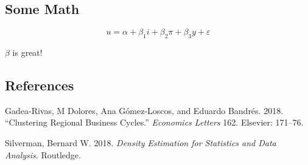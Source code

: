 \documentclass[]{article}
\begin{document}
\subsection{Some Math}\label{some-math}

\[
u = \alpha + \beta_1 i + \beta_2 \pi + \beta_3 y + \varepsilon
\]

\(\beta\) is great!

\subsection*{References}\label{references}

\hypertarget{refs}{}
\hypertarget{ref-gadea18}{}
Gadea-Rivas, M Dolores, Ana Gómez-Loscos, and Eduardo Bandrés. 2018.
``Clustering Regional Business Cycles.'' \emph{Economics Letters} 162.
Elsevier: 171--76.

\hypertarget{ref-silverman18}{}
Silverman, Bernard W. 2018. \emph{Density Estimation for Statistics and
Data Analysis}. Routledge.
\end{document}
